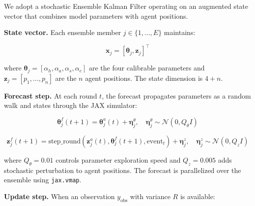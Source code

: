 \documentclass[12pt]{article}
\begin{document}
We adopt a stochastic Ensemble Kalman Filter \citep{evensen2003} operating on an augmented state vector that combines model parameters with agent positions.

\textbf{State vector.} Each ensemble member $j \in \{1, \ldots, E\}$ maintains:

\begin{equation}\label{eq:25}
\mathbf{x}_j = [\boldsymbol{\theta}_j, \mathbf{z}_j]^\top
\end{equation}

where $\boldsymbol{\theta}_j = [\alpha_h, \alpha_a, \alpha_s, \alpha_e]$ are the four calibrable parameters and $\mathbf{z}_j = [p_1, \ldots, p_n]$ are the $n$ agent positions. The state dimension is $4 + n$.

\textbf{Forecast step.} At each round $t$, the forecast propagates parameters as a random walk and states through the JAX simulator:

\begin{equation}\label{eq:26}
\boldsymbol{\theta}_j^f(t+1) = \boldsymbol{\theta}_j^a(t) + \boldsymbol{\eta}_j^\theta, \quad \boldsymbol{\eta}_j^\theta \sim \mathcal{N}(0, Q_\theta I)
\end{equation}

\begin{equation}\label{eq:27}
\mathbf{z}_j^f(t+1) = \text{step\_round}(\mathbf{z}_j^a(t), \boldsymbol{\theta}_j^f(t+1), \text{event}_t) + \boldsymbol{\eta}_j^z, \quad \boldsymbol{\eta}_j^z \sim \mathcal{N}(0, Q_z I)
\end{equation}

where $Q_\theta = 0.01$ controls parameter exploration speed and $Q_z = 0.005$ adds stochastic perturbation to agent positions. The forecast is parallelized over the ensemble using \texttt{jax.vmap}.

\textbf{Update step.} When an observation $y_{\text{obs}}$ with variance $R$ is available:
\end{document}
